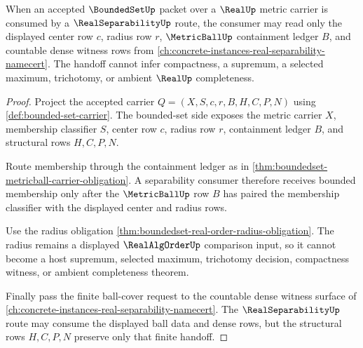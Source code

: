 \begin{theorem}
\label{thm:bounded-set-real-separability-forward-link}
When an accepted $\BoundedSetUp$ packet over a $\RealUp$ metric carrier is consumed by a $\RealSeparabilityUp$ route, the consumer may read only the displayed center row $c$, radius row $r$, $\MetricBallUp$ containment ledger $B$, and countable dense witness rows from \autoref{ch:concrete-instances-real-separability-namecert}. The handoff cannot infer compactness, a supremum, a selected maximum, trichotomy, or ambient $\RealUp$ completeness.
\end{theorem}
\begin{proof}
Project the accepted carrier $Q=(X,S,c,r,B,H,C,P,N)$ using \autoref{def:bounded-set-carrier}. The bounded-set side exposes the metric carrier $X$, membership classifier $S$, center row $c$, radius row $r$, containment ledger $B$, and structural rows $H,C,P,N$.

Route membership through the containment ledger as in \autoref{thm:boundedset-metricball-carrier-obligation}. A separability consumer therefore receives bounded membership only after the $\MetricBallUp$ row $B$ has paired the membership classifier with the displayed center and radius rows.

Use the radius obligation \autoref{thm:boundedset-real-order-radius-obligation}. The radius remains a displayed $\RealAlgOrderUp$ comparison input, so it cannot become a host supremum, selected maximum, trichotomy decision, compactness witness, or ambient completeness theorem.

Finally pass the finite ball-cover request to the countable dense witness surface of \autoref{ch:concrete-instances-real-separability-namecert}. The $\RealSeparabilityUp$ route may consume the displayed ball data and dense rows, but the structural rows $H,C,P,N$ preserve only that finite handoff.
\end{proof}

